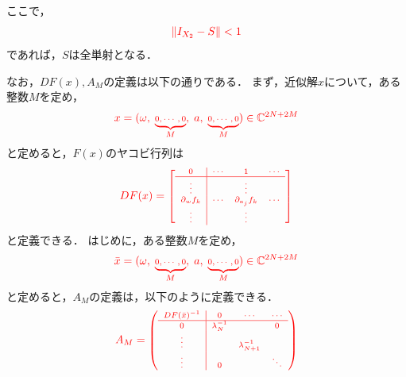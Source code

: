 \documentclass[11pt,a4paper,titlepage]{jsreport}
\theoremstyle{definition}
\newtheorem{dfn}{定義}
\providecommand{\DIFdel}[1]{{\protect\color{red} \scriptsize #1}} %
\begin{document}
\DIFdel{ここで，
}\begin{displaymath}
  \DIFdel{\label{eq:I-S_1}
  \| I_{X_2} -S \| < 1
}\end{displaymath}%
\DIFdel{であれば，$S$は全単射となる．
}%

\DIFdel{なお，$DF(x), A_M$の定義は以下の通りである．
}%
\DIFdel{まず，近似解$x$について，ある整数$M$を定め，
  }\begin{displaymath}
    \DIFdel{x = (\omega,\ \underbrace{0,\cdots,0}_{M},\ a,\ \underbrace{0,\cdots,0}_{M}) \in \mathbb{C}^{2N+2M}
  }\end{displaymath}%
\DIFdel{と定めると，$F(x)$のヤコビ行列は
  }\begin{displaymath}
    \DIFdel{DF(x) = \left[
      \begin{array}{c|ccc}
        0 & \cdots & 1 & \cdots \\ \hline
        \vdots & & \vdots &  \\
        \partial_w f_k & \cdots & \partial_{a_j}f_k & \cdots \\
        \vdots & & \vdots &
      \end{array}
    \right] %
  }\end{displaymath}%
\DIFdel{と定義できる．
}%
\DIFdel{はじめに，ある整数$M$を定め，
  }\begin{displaymath}
    \DIFdel{\bar{x} = (\omega,\ \underbrace{0,\cdots,0}_{M},\ a,\ \underbrace{0,\cdots,0}_{M}) \in \mathbb{C}^{2N+2M}
  }\end{displaymath}%
\DIFdel{と定めると，$A_M$の定義は，以下のように定義できる．
  }\begin{displaymath}
    \DIFdel{A_M = \left(
    \begin{array}{c|ccc}
      DF(\bar{x})^{-1} & 0 & \cdots & \cdots \\ \hline
      0 & \lambda_N^{-1} &  & 0 \\
      \vdots &  & \lambda_{N+1}^{-1} &  \\
      \vdots & 0 &   & \ddots
    \end{array}
    \right)
  }\end{displaymath}%
\end{document}
